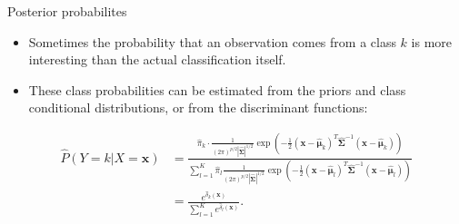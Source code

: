 \documentclass[
  10pt,
  ignorenonframetext,
]{beamer}
\providecommand{\tightlist}{%
  \setlength{\itemsep}{0pt}\setlength{\parskip}{0pt}}
\begin{document}
\begin{frame}
\begin{block}{Posterior probabilites}
\protect\hypertarget{posterior-probabilites}{}
\vspace{2mm}

\begin{itemize}
\tightlist
\item
  Sometimes the probability that an observation comes from a class \(k\)
  is more interesting than the actual classification itself.
\end{itemize}

\vspace{2mm}

\begin{itemize}
\tightlist
\item
  These class probabilities can be estimated from the priors and class
  conditional distributions, or from the discriminant functions:
\end{itemize}

\begin{align*}\hat{P}(Y=k | X=\boldsymbol{x})&=
\frac{\hat{\pi}_k \cdot \frac{1}{(2 \pi)^{p/2}|\hat{\boldsymbol{\Sigma}}|^{1/2}} \exp(-\frac{1}{2}
(\boldsymbol{x}-\hat{\boldsymbol\mu}_k)^T \hat{\boldsymbol{\Sigma}}^{-1}
(\boldsymbol{x}-\hat{\boldsymbol\mu}_k))}
{\sum_{l=1}^K \hat{\pi}_l 
\frac{1}{(2 \pi)^{p/2}|\hat{\boldsymbol{\Sigma}}|^{1/2}}
\exp(-\frac{1}{2}
(\boldsymbol{x}-\hat{\boldsymbol\mu}_l)^T 
\hat{\boldsymbol{\Sigma}}^{-1}
(\boldsymbol{x}-\hat{\boldsymbol\mu}_l))}\\
&=
\frac{e^{\hat{\delta}_k(\boldsymbol{x})}}{\sum_{l=1}^K e^{\hat{\delta}_l(\boldsymbol{x})}}.\end{align*}
\end{block}
\end{frame}
\end{document}
